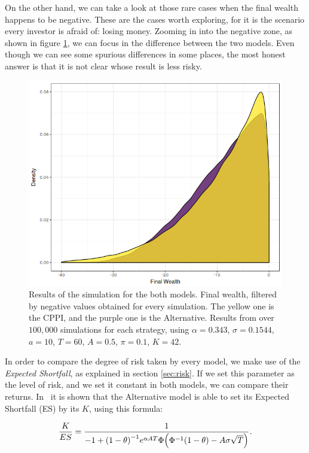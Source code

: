 On the other hand, we can take a look at those rare cases when the final wealth happens to be negative. These are the cases worth exploring, for it is the scenario every investor is afraid of: losing money. Zooming in into the negative zone, as shown in figure \ref{fig:loss_both}, we can focus in the difference between the two models. Even though we can see some spurious differences in some places, the most honest answer is that it is not clear whose result is less risky.

\begin{figure}[h]
    \centering
    \includegraphics[scale=0.5]{./images/loss_both.png}
    \caption{Results of the simulation for the both models. Final wealth, filtered by negative values obtained for every simulation. The yellow one is the CPPI, and the purple one is the Alternative. Results from over $100,000$ simulations for each strategy, using $\alpha = 0.343$, $\sigma = 0.1544$, $a = 10$, $T = 60$, $A = 0.5$, $\pi = 0.1$, $K = 42$.}
    \label{fig:loss_both}
\end{figure}

In order to compare the degree of risk taken by every model, we make use of the \textit{Expected Shortfall}, as explained in section \ref{sec:risk}. If we set this parameter as the level of risk, and we set it constant in both models, we can compare their returns. In~\cite{a:guillen-optimisation} it is shown that the Alternative model is able to set its Expected Shortfall (ES) by its $K$, using this formula:

\begin{align}\label{eq:kes}
	\frac{K}{ES} = \frac{1}{-1 + \qty(1 - \theta)^{-1} e^{\alpha A T}\Phi\qty(\Phi^{-1}\qty(1 - \theta) - A\sigma\sqrt{T})} \emph{.}
\end{align}

